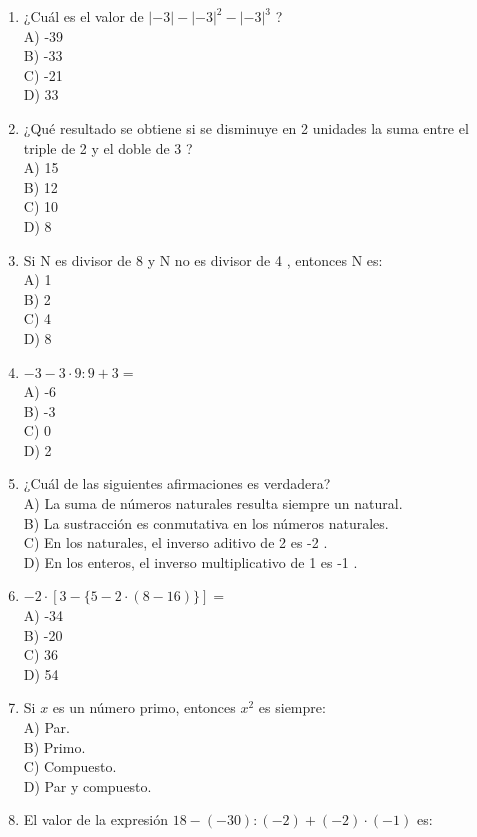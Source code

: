 \documentclass[10pt]{article}
\begin{document}
\begin{enumerate}
A) $\$ 1.000$\\
B) $\$ 1.500$\\
C) $\$ 2.000$\\
D) $\$ 2.500$
  \item ¿Cuál es el valor de $|-3|-|-3|^{2}-|-3|^{3}$ ?\\
A) -39\\
B) -33\\
C) -21\\
D) 33
  \item ¿Qué resultado se obtiene si se disminuye en 2 unidades la suma entre el triple de 2 y el doble de 3 ?\\
A) 15\\
B) 12\\
C) 10\\
D) 8
  \item Si N es divisor de 8 y N no es divisor de 4 , entonces N es:\\
A) 1\\
B) 2\\
C) 4\\
D) 8
  \item $-3-3 \cdot 9: 9+3=$\\
A) -6\\
B) -3\\
C) 0\\
D) 2
  \item ¿Cuál de las siguientes afirmaciones es verdadera?\\
A) La suma de números naturales resulta siempre un natural.\\
B) La sustracción es conmutativa en los números naturales.\\
C) En los naturales, el inverso aditivo de 2 es -2 .\\
D) En los enteros, el inverso multiplicativo de 1 es -1 .
  \item $-2 \cdot[3-\{5-2 \cdot(8-16)\}]=$\\
A) -34\\
B) -20\\
C) 36\\
D) 54
  \item Si $x$ es un número primo, entonces $x^{2}$ es siempre:\\
A) Par.\\
B) Primo.\\
C) Compuesto.\\
D) Par y compuesto.
  \item El valor de la expresión $18-(-30):(-2)+(-2) \cdot(-1)$ es:\\

\end{enumerate}
\end{document}

